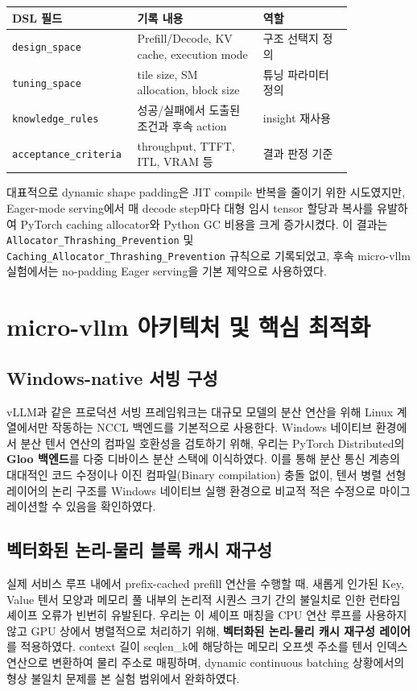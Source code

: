 \documentclass{kcc}            %
\begin{document}
\begin{table}[h]
\centering
\scriptsize
\setlength{\tabcolsep}{2pt}
\begin{tabular}{|p{0.24\linewidth}|p{0.35\linewidth}|p{0.25\linewidth}|}
\hline
\textbf{DSL 필드} & \textbf{기록 내용} & \textbf{역할} \\ \hline
\texttt{design\_space} & Prefill/Decode, KV cache, execution mode & 구조 선택지 정의 \\ \hline
\texttt{tuning\_space} & tile size, SM allocation, block size & 튜닝 파라미터 정의 \\ \hline
\texttt{knowledge\_rules} & 성공/실패에서 도출된 조건과 후속 action & insight 재사용 \\ \hline
\texttt{acceptance\_criteria} & throughput, TTFT, ITL, VRAM 등 & 결과 판정 기준 \\ \hline
\end{tabular}
\end{table}

대표적으로 dynamic shape padding은 JIT compile 반복을 줄이기 위한
시도였지만, Eager-mode serving에서 매 decode step마다 대형 임시 tensor
할당과 복사를 유발하여 PyTorch caching allocator와 Python GC 비용을 크게
증가시켰다. 이 결과는 \texttt{Allocator\_Thrashing\_Prevention} 및
\texttt{Caching\_Allocator\_Thrashing\_Prevention} 규칙으로 기록되었고,
후속 micro-vllm 실험에서는 no-padding Eager serving을 기본 제약으로
사용하였다.

\section{micro-vllm 아키텍처 및 핵심 최적화}
\subsection{Windows-native 서빙 구성}
vLLM과 같은 프로덕션 서빙 프레임워크는 대규모 모델의 분산 연산을 위해
Linux 계열에서만 작동하는 NCCL 백엔드를 기본적으로 사용한다. Windows
네이티브 환경에서 분산 텐서 연산의 컴파일 호환성을 검토하기 위해, 우리는
PyTorch Distributed의 \textbf{Gloo 백엔드}를 다중 디바이스 분산 스택에
이식하였다. 이를 통해 분산 통신 계층의 대대적인 코드 수정이나 이진
컴파일(Binary compilation) 충돌 없이, 텐서 병렬 선형 레이어의 논리 구조를
Windows 네이티브 실행 환경으로 비교적 적은 수정으로 마이그레이션할 수
있음을 확인하였다.

\subsection{벡터화된 논리-물리 블록 캐시 재구성}
실제 서비스 루프 내에서 prefix-cached prefill 연산을 수행할 때, 새롭게
인가된 Key, Value 텐서 모양과 메모리 풀 내부의 논리적 시퀀스 크기 간의
불일치로 인한 런타임 셰이프 오류가 빈번히 유발된다. 우리는 이 셰이프
매칭을 CPU 연산 루프를 사용하지 않고 GPU 상에서 병렬적으로 처리하기 위해,
\textbf{벡터화된 논리-물리 캐시 재구성 레이어}를 적용하였다. context 길이
seqlen\_k에 해당하는 메모리 오프셋 주소를 텐서 인덱스 연산으로 변환하여
물리 주소로 매핑하며, dynamic continuous batching 상황에서의 형상 불일치
문제를 본 실험 범위에서 완화하였다.
\end{document}
